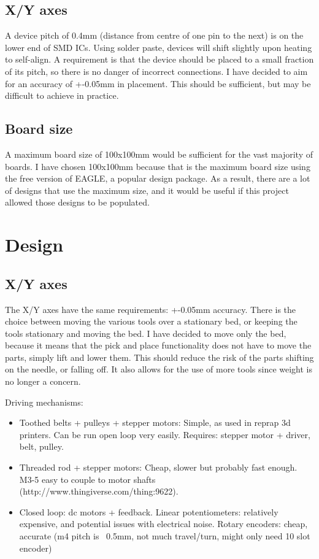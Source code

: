 \documentclass[a4paper,11pt]{article}  %
\begin{document}
\subsection{X/Y axes}
A device pitch of 0.4mm (distance from centre of one pin to the next) is on the lower end of SMD ICs. Using solder paste,
devices will shift slightly upon heating to self-align. A requirement is that the device should be placed to a
small fraction of its pitch, so there is no danger of incorrect connections. I have decided to aim for an accuracy of +-0.05mm
in placement. This should be sufficient, but may be difficult to achieve in practice.

\subsection{Board size}
A maximum board size of 100x100mm would be sufficient for the vast majority of boards. I have chosen 100x100mm because that
is the maximum board size using the free version of EAGLE, a popular design package. As a result, there are a lot of designs
that use the maximum size, and it would be useful if this project allowed those designs to be populated.

\section{Design}

\subsection{X/Y axes}

The X/Y axes have the same requirements: +-0.05mm accuracy. There is the choice between moving the various tools over a stationary
bed, or keeping the tools stationary and moving the bed. I have decided to move only the bed, because it means that the pick
and place functionality does not have to move the parts, simply lift and lower them. This should reduce the risk of the parts
shifting on the needle, or falling off. It also allows for the use of more tools since weight is no longer a concern.

Driving mechanisms:

\begin{itemize}
	\item	Toothed belts + pulleys + stepper motors: Simple, as used in reprap 3d printers. Can be run open loop
		very easily. Requires: stepper motor + driver, belt, pulley.
	\item	Threaded rod + stepper motors: Cheap, slower but probably fast enough. M3-5 easy to couple
		to motor shafts (http://www.thingiverse.com/thing:9622).
	\item	Closed loop: dc motors + feedback. Linear potentiometers: relatively expensive, and potential
		issues with electrical noise. Rotary encoders: cheap, accurate (m4 pitch is ~0.5mm, not much
		travel/turn, might only need 10 slot encoder)

\end{itemize}
\end{document}
